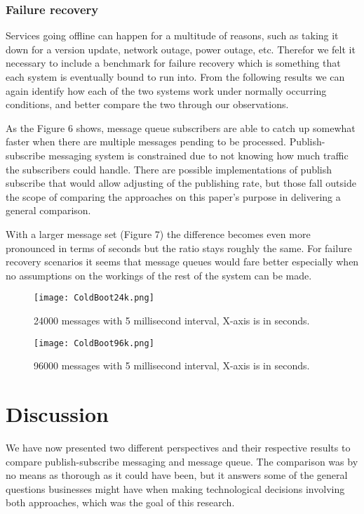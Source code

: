 \documentclass[conference]{IEEEtran}
\begin{document}
\subsubsection{Failure recovery}
Services going offline can happen for a multitude of reasons, such as taking it down for a version update, network outage, power outage, etc. Therefor we felt it necessary to include a benchmark for failure recovery which is something that each system is eventually bound to run into. From the following results we can again identify how each of the two systems work under normally occurring conditions, and better compare the two through our observations.

As the Figure 6 shows, message queue subscribers are able to catch up somewhat faster when there are multiple messages pending to be processed. Publish-subscribe messaging system is constrained due to not knowing how much traffic the subscribers could handle. There are possible implementations of publish subscribe that would allow adjusting of the publishing rate, but those fall outside the scope of comparing the approaches on this paper's purpose in delivering a general comparison.

With a larger message set (Figure 7) the difference becomes even more pronounced in terms of seconds but the ratio stays roughly the same. For failure recovery scenarios it seems that message queues would fare better especially when no assumptions on the workings of the rest of the system can be made.

\begin{figure}[!t]
    \centering
    \texttt{[image: ColdBoot24k.png]}
    \caption{24000 messages with 5 millisecond interval, X-axis is in seconds.}
\end{figure}

\begin{figure}[!t]
    \centering
    \texttt{[image: ColdBoot96k.png]}
    \caption{96000 messages with 5 millisecond interval, X-axis is in seconds.}
\end{figure}

\section{Discussion}
We have now presented two different perspectives and their respective results to compare publish-subscribe messaging and message queue. The comparison was by no means as thorough as it could have been, but it answers some of the general questions businesses might have when making technological decisions involving both approaches, which was the goal of this research.
\end{document}
